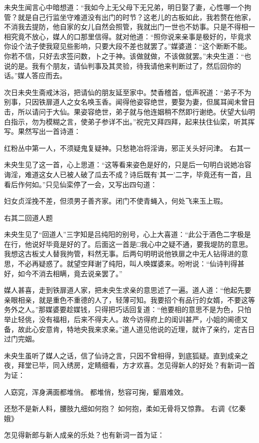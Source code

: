 \documentclass[a4paper,12pt,UTF8,twoside]{ctexbook}
\begin{document}
未央生闻言心中暗想道：“我如今上无父母下无兄弟，明日娶了妻，心性哪一个拘管？就是自己行监坐守难道没有出门的时节？这老儿的古板如此，我若赘在他家，不消我去提防，他自家的女儿自然会照管，我就出门一世也不妨事。只是不得相一相究竟不放心，媒人的口那里信得。就对他道：“照你说来亲事是极好的，毕竟求你设个法子使我窥见些影响，只要大段不差也就罢了。”媒婆道：“这个断断不能。你若不信，只好去求签问数，卜之于神。该做就做，不该做就罢。”未央生道：“也说的是。我有个朋友，请仙判事及其灵验，待我请他来判断过了，然后回你的话。”媒人答应而去。

次日未央生斋戒沐浴，把请仙的朋友延至家中。焚香稽首，低声祝道：“弟子不为别事，只因铁扉道人之女名唤玉香。闻得他姿容绝世，要娶为妻，但属耳闻未曾目击，所以请问于大仙。果姿容绝世，弟子就与他连姻稍不然即行谢绝。伏望大仙明白指示，勿为模糊之言，使弟子参详不出。”祝完又拜四拜，起来扶住仙栾，听其挥写。果然写出一首诗道：

红粉丛中第一人，不须疑鬼复疑神。只愁艳冶将淫诲，邪正关头好问津。
右其一

未央生见了这一首，心上思道：“这等看来姿色是好的，只是后一句明白说她冶容诲淫，难道这女人已被人破了瓜去不成？诗后既有‘其一’二字，毕竟还有一首，且看后作何如。”只见仙栾停了一会，又写出四句道：

妇女贞淫挽不差，但须男子善齐家。闭门不使青蝇入，何处飞来玉上瑕。

右其二回道人题

未央生见了“回道人”三字知是吕纯阳的别号，心上大喜道：“此公于酒色二字极是在行，他说好毕竟是好的了。后面这一首是□我心中之疑不通，要我堤防的意思。我想这古板丈人替我拘管，料然无事。后两句明明说他铁扉之中无人钻得进的意思，不必再疑惑了。就望空拜谢了纯阳，叫人唤媒婆来。吩咐说：“仙诗判得甚好，如今不消去相瞒，竟去说亲罢了。”

媒人甚喜，走到铁扉道人家，把未央生求亲的意思述了一遍。道人道：“他起先要亲眼相亲，就是重色不重德的人了，轻薄可知。我要招个有品行的女婿，不要这等务外之人。”那媒婆要趁媒钱，只得把巧话回复道：“他要相的意思不是为色，只怕举止轻佻，没有福相，后来不得夫人。故今访得府上的闺训甚严，小姐的阃德又备，故此心安意肯，特地央我来求亲。”道人道见他说的近理，就许了亲约，定吉日过门完姻。

未央生虽听了媒人之话，信了仙诗之言，只因不曾相得，到底狐疑。直到成亲之夜，拜堂已毕，同入绣房，定睛细看，方才欢喜。怎见得新人的好处？有新词一首为证：

人窈窕，浑身满面都堆俏。
都堆俏，愁容可掬，颦眉难效。

还愁不是新人料，腰肢九细如何抱？
如何抱，柔如无骨将又惊靠。
右调《忆秦娥》

怎见得新郎与新人成亲的乐处？也有新词一首为证：
\end{document}
